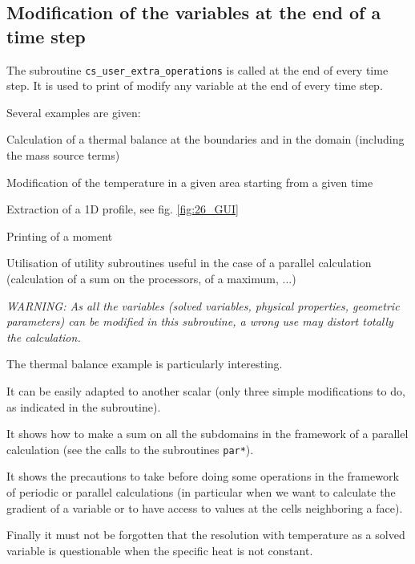 {{{\subsection{Modification of the variables at the end of a time step}

The subroutine \texttt{cs\_user\_extra\_operations} is called at the end
of every time step. It is used to print of modify any variable at the end
of every time step.

Several examples are given:
\begin{list}{-}{}
\item Calculation of a thermal balance at  the boundaries and in the
      domain (including the mass source terms)

\item Modification of the temperature in a given area starting from a
      given time

\item Extraction of a 1D profile, see fig. \ref{fig:26_GUI}

\item Printing of a moment

\item Utilisation of utility
      subroutines useful in the case of a parallel calculation
      (calculation of a sum on the processors, of a maximum, ...)
\end{list}

{\em WARNING: As all the variables (solved variables, physical
properties, geometric parameters) can be modified in this subroutine, a
wrong use may distort totally the calculation.}

The thermal balance example is particularly interesting.
\begin{list}{-}{}
\item It can be easily adapted to another scalar (only three simple
      modifications to do, as indicated in the subroutine).
\item It shows how to make a sum on all the subdomains in the framework
      of a parallel calculation (see the calls to the subroutines
      \texttt{par*}).
\item It shows the precautions to take before doing some operations in
      the framework of periodic or parallel calculations (in particular
      when we want to calculate the gradient of a variable or to have
      access to values at the cells neighboring a face).
\item Finally it must not be forgotten that the resolution with
      temperature as a solved variable is questionable when the specific
      heat is not constant.
\end{list}

}}}
